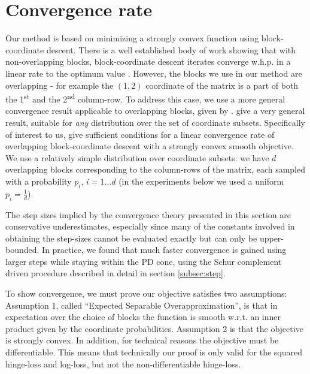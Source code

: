 \documentclass{article} %
\begin{document}
\section{Convergence rate}
Our method is based on minimizing a strongly convex function using block-coordinate descent. There is a well established body of work showing that with non-overlapping blocks, block-coordinate descent iterates converge w.h.p. in a linear rate to the optimum value \cite{nesterov2012efficiency,richtarik2014iteration}.
However, the blocks we use in our method are overlapping - for example the $(1,2)$ coordinate of the matrix is a part of both the 1\textsuperscript{st} and the 2\textsuperscript{nd} column-row. To address this case, we use a more general convergence result applicable to overlapping blocks, given by \citet{richtarik2013optimal}. \citeauthor{richtarik2013optimal} give a very general result, suitable for \emph{any} distribution over the set of coordinate subsets. 
Specifically of interest to us, \citeauthor{richtarik2013optimal} give sufficient conditions for a linear convergence rate of overlapping block-coordinate descent with a strongly convex smooth objective. 
We use a relatively simple distribution over coordinate subsets: we have $d$ overlapping blocks corresponding to the column-rows of the matrix, each sampled with a probability $p_i$, $i=1 \ldots d$ (in the experiments below we used a uniform $p_i = \frac{1}{d}$).

The step sizes implied by the convergence theory presented in this section are conservative underestimates, especially since many of the constants involved in obtaining the step-sizes cannot be evaluated exactly but can only be upper-bounded. In practice, we found that much faster convergence is gained using larger steps while staying within the PD cone, using the Schur complement driven procedure described in detail in section \ref{subsec:step}.

To show convergence, we must prove our objective satisfies two assumptions: Assumption 1, called ``Expected Separable Overapproximation'', is that in expectation over the choice of blocks the function is smooth w.r.t. an inner product given by the coordinate probabilities. Assumption 2 is that the objective is strongly convex. In addition, for technical reasons the objective must be differentiable. This means that technically our proof is only valid for the squared hinge-loss and log-loss, but not the non-differentiable hinge-loss.
\end{document}
